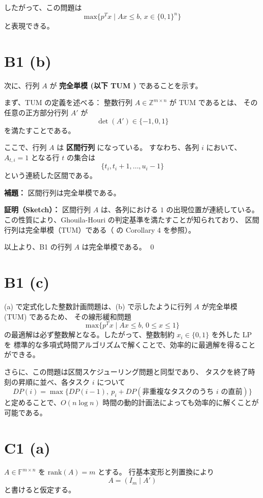 \documentclass[a4paper]{ltjsarticle}
\begin{document}
したがって、この問題は
\[
  \text{max} \{ p^T x \mid A x \le b, \, x \in \{0,1\}^n \}
\]
と表現できる。

\section*{B1 (b)}

次に、行列 $A$ が \textbf{完全単模 (以下 TUM )} であることを示す。

\medskip
まず、TUM の定義を述べる：
整数行列 $A \in \mathbb{Z}^{m \times n}$ が TUM であるとは、
その任意の正方部分行列 $A'$ が
\[
  \det(A') \in \{-1, 0, 1\}
\]
を満たすことである。

\medskip
ここで、行列 $A$ は \textbf{区間行列} になっている。
すなわち、各列 $i$ において、$A_{t,i} = 1$ となる行 $t$ の集合は
\[
  \{ t_i, t_i + 1, \dots, u_i - 1 \}
\]
という連続した区間である。

\medskip
\textbf{補題：} 区間行列は完全単模である。

\medskip
\textbf{証明（Sketch）：}
区間行列 $A$ は、各列における $1$ の出現位置が連続している。
この性質により、Ghouila-Houri の判定基準を満たすことが知られており、
区間行列は完全単模（TUM）である（\cite{unimodularPDF} の Corollary 4 を参照）。

\medskip
以上より、B1 の行列 $A$ は完全単模である。
\qed

\section*{B1 (c)}

(a) で定式化した整数計画問題は、(b) で示したように行列 $A$ が完全単模 (TUM) であるため、
その線形緩和問題
\[
  \text{max} \{ p^T x \mid A x \le b, \, 0 \le x \le 1 \}
\]
の最適解は必ず整数解となる。したがって、整数制約 $x_i \in \{0,1\}$ を外した LP を
標準的な多項式時間アルゴリズムで解くことで、効率的に最適解を得ることができる。

さらに、この問題は区間スケジューリング問題と同型であり、
タスクを終了時刻の昇順に並べ、各タスク $i$ について
\[
  DP(i) = \max \{ DP(i-1),\ p_i + DP(\text{非重複なタスクのうち $i$ の直前}) \}
\]
と定めることで、$O(n \log n)$ 時間の動的計画法によっても効率的に解くことが可能である。

\section*{C1 (a)}

$A \in \mathbb{F}^{m \times n}$ を $\mathrm{rank}(A) = m$ とする。
行基本変形と列置換により
\[
  A = ( I_m \mid A')
\]
と書けると仮定する。
\end{document}
